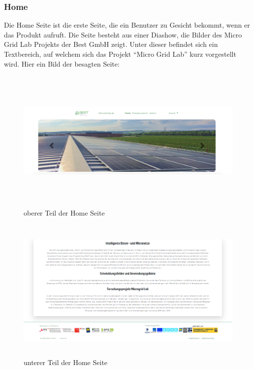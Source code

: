 \subsubsection{Home}
Die Home Seite ist die erste Seite, die ein Benutzer zu Gesicht bekommt, wenn er das Produkt aufruft. Die Seite besteht aus einer Diashow, die Bilder des Micro Grid Lab Projekts der Best GmbH zeigt. Unter dieser befindet sich ein Textbereich, auf welchem sich das Projekt “Micro Grid Lab” kurz vorgestellt wird. Hier ein Bild der besagten Seite:
\begin{figure}[h]
	\centering
	\includegraphics[height=7cm,width=14cm]{images/HomeSeite1}
	\caption{oberer Teil der Home Seite}
	\label{fig:HomeSeite1}
\end{figure}
\begin{figure}[h]
	\centering
	\includegraphics[height=7cm,width=14cm]{images/HomeSeite2}
	\caption{unterer Teil der Home Seite}
	\label{fig:HomeSeite1}
\end{figure}

